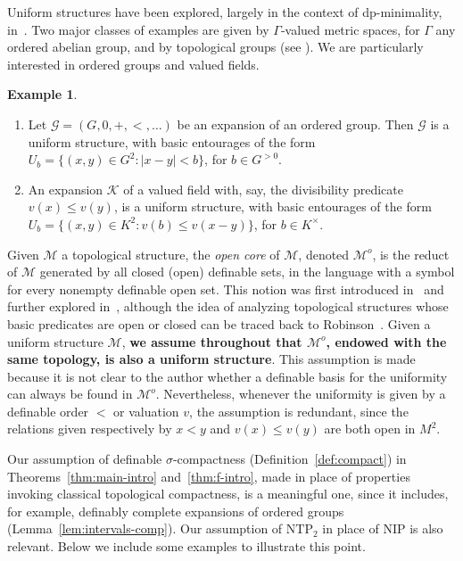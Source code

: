 \documentclass[12pt]{article}
\newcommand{\Kk}{\mathcal{K}}
\newcommand{\Mm}{\mathcal{M}}
\newcommand{\Gg}{\mathcal{G}}
\newcommand{\NIP}{\ensuremath{\mathrm{NIP}}}
\newcommand{\NTP}{\ensuremath{\mathrm{NTP}_2}}
\newcommand{\Mo}{\Mm^o}%
\theoremstyle{definition}
\newtheorem{example}[theorem]{Example}
\theoremstyle{remark}
\begin{document}
Uniform structures have been explored, largely in the context of dp-minimality, in~\cite{sim-wals19, dolich-good22}. 
Two major classes of examples are given by $\Gamma$-valued metric spaces, for $\Gamma$ any ordered abelian group, and by topological groups (see \cite{sim-wals19}). We are particularly interested in ordered groups and valued fields.  
\begin{example}
 \begin{enumerate}
     \item Let $\Gg=(G,0,+,<,\ldots)$ be an expansion of an ordered group. Then $\Gg$ is a uniform structure, with basic entourages of the form $U_b=\{ (x,y)\in G^2 : |x-y|<b\}$, for $b\in G^{>0}$. 
     \item An expansion $\Kk$ of a valued field with, say, the divisibility predicate $v(x)\leq v(y)$, is a uniform structure, with basic entourages of the form $U_b=\{ (x,y)\in K^2 : v(b) \leq v(x-y)\}$, for $b\in K^\times$.   
 \end{enumerate}   
\end{example}

Given $\Mm$ a topological structure, the \emph{open core} of $\Mm$, denoted $\Mo$, is the reduct of $\Mm$ generated by all closed (open) definable sets, in the language with a symbol for every nonempty definable open set. This notion was first introduced in~\cite{MS99} and further explored in~\cite{DMS10}, although the idea of analyzing topological structures whose basic predicates are open or closed can be traced back to Robinson~\cite{rob73}. Given a uniform structure $\Mm$, \textbf{we assume throughout that $\Mo$, endowed with the same topology, is also a uniform structure}. This assumption is made because it is not clear to the author whether a definable basis for the uniformity can always be found in $\Mo$. Nevertheless, whenever the uniformity is given by a definable order $<$ or valuation $v$, the assumption is redundant, since the relations given respectively by $x < y$ and $v(x)\leq v(y)$ are both open in $M^2$. 


Our assumption of definable $\sigma$-compactness (Definition~\ref{def:compact}) in Theorems~\ref{thm:main-intro} and~\ref{thm:f-intro}, made in place of properties invoking classical topological compactness, is a meaningful one, since it includes, for example, definably complete expansions of ordered groups (Lemma~\ref{lem:intervals-comp}). Our assumption of $\NTP$ in place of $\NIP$ is also relevant. Below we include some examples to illustrate this point.  
\end{document}
